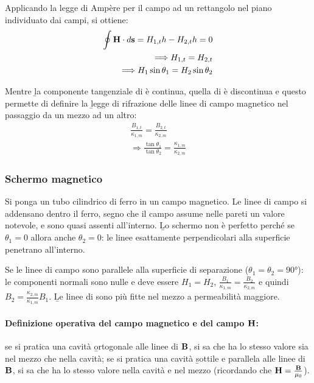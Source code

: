 Applicando la legge di Ampère per il campo \dH ad un rettangolo nel piano individuato dai campi, si ottiene:
\begin{equation}\begin{split}
\oint{\mathbf{H}\cdot d\mathbf{s}}=H_{1,t}h-H_{2,t}h=0\\
\Longrightarrow H_{1,t}=H_{2,t}\\
\Longrightarrow H_1\sin{\theta_1}=H_2\sin{\theta_2}
\end{split}\end{equation}

Mentre \b{la componente tangenziale di \dH è continua, quella di \dB è discontinua} e questo permette di definire la \b{legge di rifrazione delle linee di campo magnetico nel passaggio da un mezzo ad un altro}:
\begin{equation}\begin{split}
\frac{B_{1,t}}{\kappa_{1,m}}=\frac{B_{2,t}}{\kappa_{2,m}}\\
\Longrightarrow \frac{\tan{\theta_1}}{\tan{\theta_2}}=\frac{\kappa_{1,m}}{\kappa_{2,m}}
\end{split}\end{equation}

\subsubsection{Schermo magnetico}
Si ponga un tubo cilindrico di ferro in un campo magnetico. Le linee di campo si addensano dentro il ferro, segno che il campo assume nelle pareti un valore notevole, e sono quasi assenti all'interno. \b{Lo schermo non è perfetto} perché se $\theta_1=0$ allora anche $\theta_2=0$: le linee esattamente perpendicolari alla superficie penetrano all'interno.

Se le linee di campo sono parallele alla superficie di separazione ($\theta_1=\theta_2=\si{90\degree}$): le componenti normali sono nulle e deve essere $H_1=H_2$, $\frac{B_1}{\kappa_{1,m}}=\frac{B_2}{\kappa_{2,m}}$ e quindi $B_2=\frac{\kappa_{2,m}}{\kappa_{1,m}}B_1$. \b{Le linee di \dB sono più fitte nel mezzo a permeabilità maggiore}.

\paragraph{Definizione operativa del campo magnetico \dB e del campo $\mathbf{H}$:} se si pratica una cavità \b{ortogonale} alle linee di $\mathbf{B}$, si sa che \dB ha lo stesso valore sia nel mezzo che nella cavità; se si pratica una cavità \b{sottile e parallela} alle linee di $\mathbf{B}$, si sa che \dH ha lo stesso valore nella cavità e nel mezzo (ricordando che $\mathbf{H}=\frac{\mathbf{B}}{\mu_0}$).

